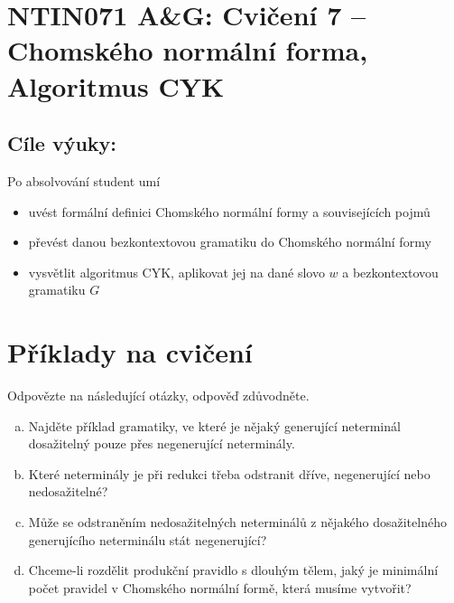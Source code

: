 \documentclass[a4paper,12pt]{amsart}
\begin{document}
\thispagestyle{empty}

\section*{NTIN071 A\&G: Cvičení 7 -- Chomského normální forma, Algoritmus CYK}

\medskip

\subsection*{Cíle výuky:} Po absolvování student umí

\begin{itemize}\setlength{\itemsep}{0pt}
    \item uvést formální definici Chomského normální formy a souvisejících pojmů
    \item převést danou bezkontextovou gramatiku do Chomského normální formy
    \item vysvětlit algoritmus CYK, aplikovat jej na dané slovo $w$ a bezkontextovou gramatiku $G$
\end{itemize}

\section*{Příklady na cvičení}

\medskip\begin{problem}
    
    Odpovězte na následující otázky, odpověď zdůvodněte.
    
    \begin{enumerate}[(a)]\setlength{\itemsep}{6pt}
        \item Najděte příklad gramatiky, ve které je nějaký generující neterminál dosažitelný pouze přes negenerující neterminály.
        \item Které neterminály je při redukci třeba odstranit dříve, negenerující nebo nedosažitelné?
        \item Může se odstraněním nedosažitelných neterminálů z nějakého dosažitelného generujícího neterminálu stát negenerující?
        \item Chceme-li rozdělit produkční pravidlo s dlouhým tělem, jaký je minimální počet pravidel v Chomského normální formě, která musíme vytvořit?
    \end{enumerate}

\end{problem}
    
\end{document}
